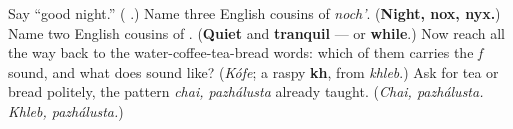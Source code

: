 \begin{tcolorbox}[breakable,colback=teal!4,colframe=teal!35!black,title={Before you move on}]
Say \textquotedblleft{}good night.\textquotedblright{} (\textbf{ }.) Name three English cousins of \emph{noch'}. (\textbf{Night, nox, nyx.}) Name two English cousins of \emph{}. (\textbf{Quiet} and \textbf{tranquil} — or \textbf{while}.) Now reach all the way back to the water-coffee-tea-bread words: which of them carries the \emph{f} sound, and what does \textbf{} sound like? (\emph{Kófe}; a raspy \textbf{kh}, from \emph{khleb}.) Ask for tea or bread politely, the pattern \emph{chai, pazhálusta} already taught. (\emph{Chai, pazhálusta. Khleb, pazhálusta.})
\end{tcolorbox}
